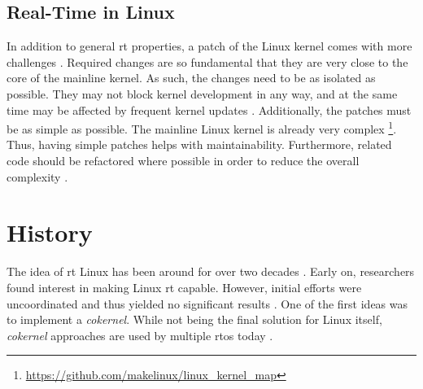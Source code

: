 \documentclass[10pt,twocolumn,a4paper]{article}
\begin{document}
\subsection{Real-Time in Linux}
In addition to general \acrshort{rt} properties, a patch of the Linux kernel comes with more challenges \cite{jason_perlow_trenches_2021}.
Required changes are so fundamental that they are very close to the core of the mainline kernel.
As such, the changes need to be as isolated as possible.
They may not block kernel development in any way, and at the same time may be affected by frequent kernel updates \cite{jason_perlow_trenches_2021}.
Additionally, the patches must be as simple as possible.
The mainline Linux kernel is already very complex \footnote{\url{https://github.com/makelinux/linux_kernel_map}}.
Thus, having simple patches helps with maintainability.
Furthermore, related code should be refactored where possible in order to reduce the overall complexity \cite{jason_perlow_trenches_2021}.


\section{History}
The idea of \acrshort{rt} Linux has been around for over two decades \cite{casimiro_how_2000}.
Early on, researchers found interest in making Linux \acrshort{rt} capable.
However, initial efforts were uncoordinated and thus yielded no significant results \cite{jason_perlow_trenches_2021}.
One of the first ideas was to implement a \emph{cokernel}.
While not being the final solution for Linux itself, \emph{cokernel} approaches are used by multiple \acrshort{rtos} today \cite{reghenzani_realtime_2019}.
\end{document}
